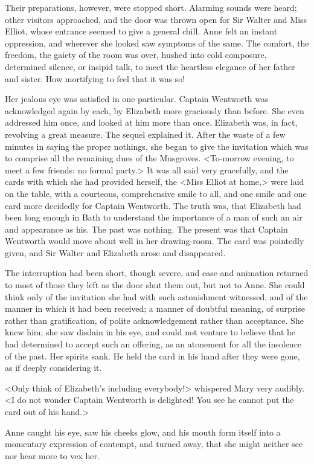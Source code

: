 Their preparations, however, were stopped short. Alarming sounds were heard; other visitors approached, and the door was thrown open for Sir Walter and Miss Elliot, whose entrance seemed to give a general chill. Anne felt an instant oppression, and wherever she looked saw symptoms of the same. The comfort, the freedom, the gaiety of the room was over, hushed into cold composure, determined silence, or insipid talk, to meet the heartless elegance of her father and sister. How mortifying to feel that it was so!

Her jealous eye was satisfied in one particular. Captain Wentworth was acknowledged again by each, by Elizabeth more graciously than before. She even addressed him once, and looked at him more than once. Elizabeth was, in fact, revolving a great measure. The sequel explained it. After the waste of a few minutes in saying the proper nothings, she began to give the invitation which was to comprise all the remaining dues of the Musgroves. <To-morrow evening, to meet a few friends: no formal party.> It was all said very gracefully, and the cards with which she had provided herself, the <Miss Elliot at home,> were laid on the table, with a courteous, comprehensive smile to all, and one smile and one card more decidedly for Captain Wentworth. The truth was, that Elizabeth had been long enough in Bath to understand the importance of a man of such an air and appearance as his. The past was nothing. The present was that Captain Wentworth would move about well in her drawing-room. The card was pointedly given, and Sir Walter and Elizabeth arose and disappeared.

The interruption had been short, though severe, and ease and animation returned to most of those they left as the door shut them out, but not to Anne. She could think only of the invitation she had with such astonishment witnessed, and of the manner in which it had been received; a manner of doubtful meaning, of surprise rather than gratification, of polite acknowledgement rather than acceptance. She knew him; she saw disdain in his eye, and could not venture to believe that he had determined to accept such an offering, as an atonement for all the insolence of the past. Her spirits sank. He held the card in his hand after they were gone, as if deeply considering it.

<Only think of Elizabeth's including everybody!> whispered Mary very audibly. <I do not wonder Captain Wentworth is delighted! You see he cannot put the card out of his hand.>

Anne caught his eye, saw his cheeks glow, and his mouth form itself into a momentary expression of contempt, and turned away, that she might neither see nor hear more to vex her.

